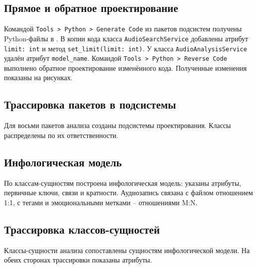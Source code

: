 
\subsection{Прямое и обратное проектирование}
Командой \texttt{Tools > Python > Generate Code} из пакетов
подсистем получены Python-файлы в .
В копии кода класса \texttt{AudioSearchService} добавлены атрибут
\texttt{limit: int} и метод \texttt{set\_limit(limit: int)}.
У класса \texttt{AudioAnalysisService} удалён атрибут \texttt{model\_name}.
Командой \texttt{Tools > Python > Reverse Code} выполнено обратное
проектирование изменённого кода. Полученные изменения показаны на рисунках.



\subsection{Трассировка пакетов в подсистемы}
Для восьми пакетов анализа созданы подсистемы проектирования.
Классы распределены по их ответственности.


\subsection{Инфологическая модель}
По классам-сущностям построена инфологическая модель:
указаны атрибуты, первичные ключи, связи и кратности.
Аудиозапись связана с файлом отношением 1:1, с тегами и
эмоциональными метками -- отношениями M:N.




\subsection{Трассировка классов-сущностей}
Классы-сущности анализа сопоставлены сущностям инфологической модели.
На обеих сторонах трассировки показаны атрибуты.


